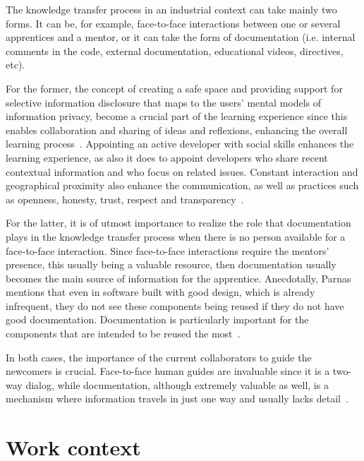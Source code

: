 \documentclass[12pt, letterpaper]{article}
\begin{document}
The knowledge transfer process in an industrial context can take mainly two forms. It can be, for example,
face-to-face interactions between one or several apprentices and a mentor, or it can take the form of documentation 
(i.e. internal comments in the code, external documentation, educational videos, directives, etc). 

For the 
former, the concept of creating a safe space and providing support for selective information disclosure that
maps to the users' mental models of information privacy, become a crucial part of the learning
experience since this enables collaboration and sharing of ideas and reflexions, enhancing
the overall learning process~\cite{Razavi06}. Appointing an active developer with social skills
enhances the learning experience, as also it does to appoint developers who share recent
contextual information and who focus on related issues\cite{Steinmacher12}. Constant interaction
and geographical proximity also enhance the communication, as well as practices such as 
openness, honesty, trust, respect and transparency~\cite{Whitworth06}. 

For the latter,
it is of utmost importance to realize the role that documentation plays in the knowledge transfer
process when there is no person available for a face-to-face interaction. Since face-to-face interactions
require the mentors' presence, this usually being a valuable resource, then documentation usually
becomes the main source of information for the apprentice. Anecdotally, Parnas mentions that even
in software built with good design, which is already infrequent, they do not see these components being
reused if they do not have good documentation\cite{brooks95}. Documentation is particularly important 
for the components that are intended to be reused the most~\cite{monperrus11}.

In both cases, the importance of the current collaborators to guide the newcomers is crucial.
Face-to-face human guides are invaluable since it is a two-way dialog, while documentation,
although extremely valuable as well, is a mechanism
where information travels in just one way and usually lacks detail~\cite{Dagenais10}.


 


 
\section{Work context}
\end{document}
